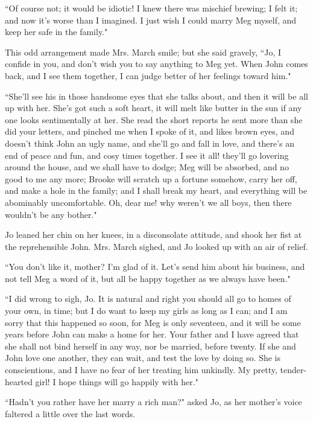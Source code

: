 ``Of course not; it would be idiotic! I knew there was mischief brewing;
I felt it; and now it's worse than I imagined. I just
wish I could marry Meg myself, and keep her safe in the family."

This odd arrangement made Mrs. March smile; but she said gravely, ``Jo, I
confide in you, and don't wish you to say anything to
Meg yet. When John comes back, and I see them together, I can judge
better of her feelings toward him."

``She'll see his in those handsome eyes that she talks
about, and then it will be all up with her. She's got
such a soft heart, it will melt like butter in the sun if any one looks
sentimentally at her. She read the short reports he sent more than she
did your letters, and pinched me when I spoke of it, and likes brown
eyes, and doesn't think John an ugly name, and
she'll go and fall in love, and there's
an end of peace and fun, and cosy times together. I see it all!
they'll go lovering around the house, and we shall have
to dodge; Meg will be absorbed, and no good to me any more; Brooke will
scratch up a fortune somehow, carry her off, and make a hole in the
family; and I shall break my heart, and everything will be abominably
uncomfortable. Oh, dear me! why weren't we all boys,
then there wouldn't be any bother."

Jo leaned her chin on her knees, in a disconsolate attitude, and shook
her fist at the reprehensible John. Mrs. March sighed, and Jo looked up
with an air of relief.

``You don't like it, mother? I'm glad of
it. Let's send him about his business, and not tell Meg
a word of it, but all be happy together as we always have been."

``I did wrong to sigh, Jo. It is natural and right you should all go to
homes of your own, in time; but I do want to keep my girls as long as I
can; and I am sorry that this happened so soon, for Meg is only
seventeen, and it will be some years before John can make a home for
her. Your father and I have agreed that she shall not bind herself in
any way, nor be married, before twenty. If she and John love one
another, they can wait, and test the love by doing so. She is
conscientious, and I have no fear of her treating him unkindly. My
pretty, tender-hearted girl! I hope things will go happily with her."

``Hadn't you rather have her marry a rich man?" asked Jo,
as her mother's voice faltered a little over the last
words.

